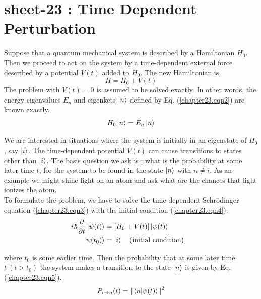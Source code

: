 
\chapter{sheet-23 : Time Dependent Perturbation}
\ifpdf
\graphicspath{{Chapter23/figs/}}
\else
\graphicspath{{Chapter23/figs/}}
\fi


Suppose that a quantum mechanical system is described by a Hamiltonian $H_0$. Then we proceed to act on the system by a time-dependent external force described by a potential $V(t)$ added to $H_0$. The new Hamiltonian is
\begin{equation}
\label{chapter23.eqn1}
H = H_0 + V(t)
\end{equation}
The problem with $V(t) = 0$ is assumed to be solved exactly. In other words, the energy eigenvalues $E_n$ and eigenkets $\ket{n}$ defined by Eq. (\ref{chapter23.eqn2}) are known exactly.
\begin{equation}
\label{chapter23.eqn2}
H_0 \ket{n} = E_n \ket{n}
\end{equation}

We are interested in situations where the system is initially in an eigenstate of $H_0$, say $\ket{i}$. The time-dependent potential $V(t)$ can cause transitions to states other than $\ket{i}$. The basis question we ask is : what is the probability at some later time $t$, for the system to be found in the state $\ket{n}$ with $n\neq i$. As an example we might shine light on an atom and ask what are the chances that light ionizes the atom. \\

To formulate the problem, we have to solve the time-dependent Schr\"{o}dinger equation (\ref{chapter23.eqn3}) with the initial condition (\ref{chapter23.eqn4}).
\begin{align}
\label{chapter23.eqn3}
\iu \hbar \pdv{}{t}\ket{\psi(t)} &= \qty[H_0 + V(t)] \ket{\psi(t)} \\
\label{chapter23.eqn4}
\ket{\psi(t_0)} &= \ket{i} \qq{(initial condition)}
\end{align}

where $t_0$ is some earlier time. Then the probability that at some later time $t\ (t > t_0)$ the system makes a transition to the state $\ket{n}$ is given by Eq. (\ref{chapter23.eqn5}).
\begin{equation}
\label{chapter23.eqn5}
P_{i \rightarrow n}(t) = \norm{\braket{n}{\psi(t)}}^2
\end{equation}

